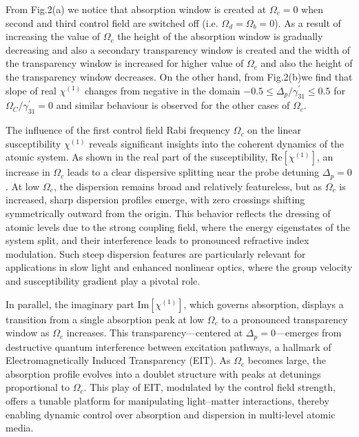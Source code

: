 \documentclass[12pt,a4paper]{article}
\begin{document}
From Fig.2(a) we notice that absorption window is created at $\Omega_{c}=0$ when second and third control field are switched off (i.e. $\Omega_{d}=\Omega_{b}=0$). As a result of increasing the value of $\Omega_{c}$ the height of the absorption window is gradually decreasing and also a secondary transparency window is created and the width of the transparency window is increased for higher value of $\Omega_{c}$ and also the height of the transparency window decreases. On the other hand, from Fig.2(b)we find that slope of real $\chi^{(1)}$ changes from negative in the domain $-0.5 \leq \Delta_{p}/\gamma^{\prime}_{31} \leq 0.5$ for $\Omega_{C}/\gamma^{\prime}_{31}=0$ and similar behaviour is observed for the other cases of $\Omega_{c}$.

The influence of the first control field Rabi frequency $\Omega_c$ on the linear susceptibility $\chi^{(1)}$ reveals significant insights into the coherent dynamics of the atomic system. As shown in the real part of the susceptibility, $\mathrm{Re}[\chi^{(1)}]$, an increase in $\Omega_c$ leads to a clear dispersive splitting near the probe detuning $\Delta_p = 0$. At low $\Omega_c$, the dispersion remains broad and relatively featureless, but as $\Omega_c$ is increased, sharp dispersion profiles emerge, with zero crossings shifting symmetrically outward from the origin. This behavior reflects the dressing of atomic levels due to the strong coupling field, where the energy eigenstates of the system split, and their interference leads to pronounced refractive index modulation. Such steep dispersion features are particularly relevant for applications in slow light and enhanced nonlinear optics, where the group velocity and susceptibility gradient play a pivotal role.

In parallel, the imaginary part $\mathrm{Im}[\chi^{(1)}]$, which governs absorption, displays a transition from a single absorption peak at low $\Omega_c$ to a pronounced transparency window as $\Omega_c$ increases. This transparency---centered at $\Delta_p = 0$---emerges from destructive quantum interference between excitation pathways, a hallmark of Electromagnetically Induced Transparency (EIT). As $\Omega_c$ becomes large, the absorption profile evolves into a doublet structure with peaks at detunings proportional to $\Omega_c$. This play of EIT, modulated by the control field strength, offers a tunable platform for manipulating light--matter interactions, thereby enabling dynamic control over absorption and dispersion in multi-level atomic media.
\end{document}
